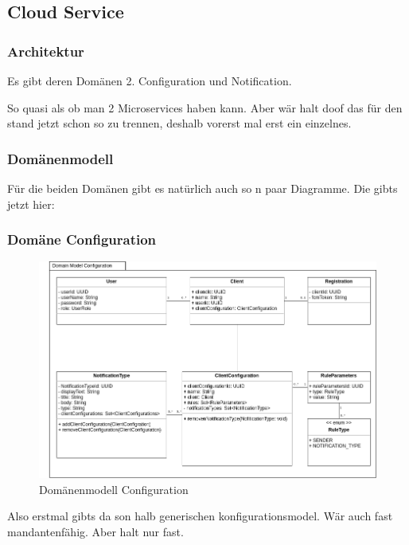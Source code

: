 
\subsection{Cloud Service}\label{subsec:cloud-service}

\subsubsection{Architektur}

Es gibt deren Domänen 2. Configuration und Notification.

So quasi als ob man 2 Microservices haben kann. Aber wär halt doof das für den stand jetzt schon so zu trennen, deshalb vorerst mal erst ein einzelnes.

\clearpage

\subsubsection{Domänenmodell}


Für die beiden Domänen gibt es natürlich auch so n paar Diagramme. Die gibts jetzt hier:


\subsubsection*{Domäne Configuration}

\begin{figure}[h]
    \centering
    \begin{minipage}[b]{1.0\textwidth}
        \includegraphics[width=\textwidth]{graphics/Class_Configuration_Domain}
        \caption{Domänenmodell Configuration}
    \end{minipage}
\end{figure}
Also erstmal gibts da son halb generischen konfigurationsmodel.
Wär auch fast mandantenfähig.
Aber halt nur fast.



